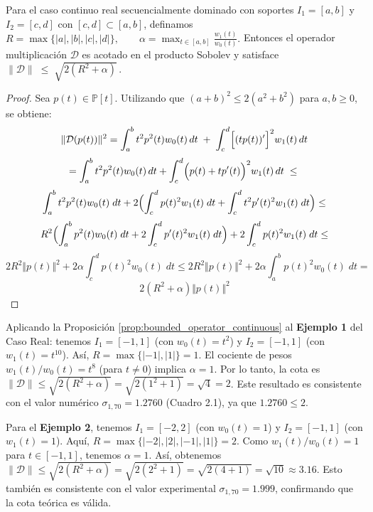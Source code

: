 \begin{proposition}\label{prop:bounded_operator_continuous}
	Para el caso continuo real secuencialmente dominado con soportes $I_1=[a,b]$ y $I_2=[c,d]$ con $[c,d] \subset [a,b]$, definamos
	\(
	R = \max\{|a|,|b|,|c|,|d|\},
	\qquad
	\alpha = \max_{t\in[a,b]}\frac{w_1(t)}{w_0(t)}.
	\)
	Entonces el operador multiplicación $\mathcal{D}$
	es acotado en el producto Sobolev y satisface
	\(
	\|\mathcal{D}\|\;\le\;\sqrt{2(R^{2}+\alpha)}\,.
	\)
\end{proposition}

\begin{proof}
	Sea $p(t)\in\mathbb{P}[t]$.
	\noindent Utilizando que $(a+b)^2\leq 2(a^2+b^2)$ para $a,b\ge0$, se obtiene:
	$$
		\Vert \mathcal{D}(p(t))\Vert^{2}
		= \int_{a}^{b} t^2 p^2(t) w_0(t)\,dt
		\;+\;\int_{c}^{d} \Bigl[(tp(t))'\Bigr]^2 w_1(t)\,dt
	$$
	$$
		= \int_{a}^{b} t^2 p^2(t) w_0(t)\,dt
		+ \int_{c}^{d} \Bigl(p(t)+tp'(t)\Bigr)^2 w_1(t)\,dt
		\;\le\;
	$$
	$$
		\int_{a}^{b} t^2p^2(t)w_0(t)\; dt+2\Bigl(\int_{c}^{d} p(t)^2w_1(t)\; dt +\int_{c}^{d} t^2p'(t)^2w_1(t)\; dt\Bigr) \leq
	$$
	$$
		R^{2} \Bigl(\int_{a}^{b} p^2(t)w_0(t)\; dt +  2\int_{c}^{d} p'(t)^2w_1(t)\; dt\Bigr)+ 2\int_{c}^{d} p(t)^2w_1(t)\; dt \leq
	$$
	$$
		2R^{2} \Vert p(t)\Vert^{2} + 2\alpha \int_{c}^{d} p(t)^2w_0(t)\; dt \leq 2R^{2} \Vert p(t)\Vert^{2} + 2\alpha \int_{a}^{b} p(t)^2w_0(t)\; dt =
	$$
	$$
		2(R^{2}+\alpha)\Vert p(t) \Vert^{2}
	$$

\end{proof}

\noindent Aplicando la Proposición \ref{prop:bounded_operator_continuous} al \textbf{Ejemplo 1} del Caso Real: tenemos $I_1 = [-1,1]$ (con $w_0(t)=t^2$) y $I_2 = [-1,1]$ (con $w_1(t)=t^{10}$). Así, $R = \max\{|-1|,|1|\} = 1$. El cociente de pesos $w_1(t)/w_0(t) = t^8$ (para $t \neq 0$) implica $\alpha = 1$. Por lo tanto, la cota es $\|\mathcal{D}\| \le \sqrt{2(R^2 + \alpha)} = \sqrt{2(1^2 + 1)} = \sqrt{4} = 2$. Este resultado es consistente con el valor numérico $\sigma_{1,70} = 1.2760$ (Cuadro 2.1), ya que $1.2760 \le 2$.

\noindent Para el \textbf{Ejemplo 2}, tenemos $I_1 = [-2,2]$ (con $w_0(t)=1$) y $I_2 = [-1,1]$ (con $w_1(t)=1$). Aquí, $R = \max\{|-2|,|2|,|-1|,|1|\} = 2$. Como $w_1(t)/w_0(t) = 1$ para $t \in [-1,1]$, tenemos $\alpha = 1$. Así, obtenemos $\|\mathcal{D}\| \le \sqrt{2(R^2 + \alpha)} = \sqrt{2(2^2 + 1)} = \sqrt{2(4 + 1)} = \sqrt{10} \approx 3.16$. Esto también es consistente con el valor experimental $\sigma_{1,70} = 1.999$, confirmando que la cota teórica es válida.


